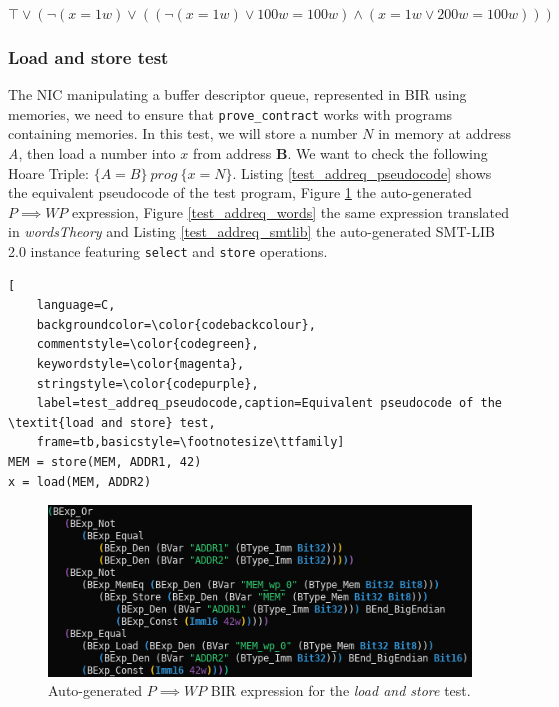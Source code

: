\documentclass{kththesis}
\newcommand{\htriple}[3]{\ensuremath{\{#1\}~#2~\{#3\}}}
\newcommand{\WP}{\ensuremath{\mathit{WP}}}
\begin{document}
\begin{equation}
    \top \lor
    (\neg(x = 1w) \lor ((\neg(x = 1w) \lor 100w = 100w) \land (x = 1w \lor 200w = 100w)))
    \label{test_cjmp_words}
\end{equation}

\subsubsection{Load and store test} \label{addreq_test}

The \gls{NIC} manipulating a buffer descriptor queue, represented in BIR using memories, we need to ensure that \texttt{prove\_contract} works with programs containing memories. In this test, we will store a number $N$ in memory at address \textit{A}, then load a number into $x$ from address \textbf{B}. We want to check the following Hoare Triple: \htriple{A=B}{prog}{x=N}. Listing \ref{test_addreq_pseudocode} shows the equivalent pseudocode of the test program, Figure \ref{test_addreq_bir} the auto-generated $P \implies \WP$ expression, Figure \ref{test_addreq_words} the same expression translated in \textit{wordsTheory} and Listing \ref{test_addreq_smtlib} the auto-generated SMT-LIB 2.0 instance featuring \texttt{select} and \texttt{store} operations.

\begin{lstlisting}[
    language=C,
    backgroundcolor=\color{codebackcolour},
    commentstyle=\color{codegreen},
    keywordstyle=\color{magenta},
    stringstyle=\color{codepurple},
    label=test_addreq_pseudocode,caption=Equivalent pseudocode of the \textit{load and store} test,
    frame=tb,basicstyle=\footnotesize\ttfamily]
MEM = store(MEM, ADDR1, 42)
x = load(MEM, ADDR2)
\end{lstlisting}

\begin{figure}[!h]
	\includegraphics[width=\textwidth]{figures/test_addreq_bir.png}
	\centering
	\caption{Auto-generated $P \implies \WP$ BIR expression for the \textit{load and store} test.}
	\label{test_addreq_bir}
\end{figure}
\end{document}
